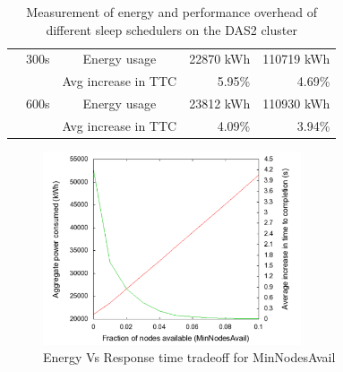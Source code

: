 \begin{table}
\begin{tabular}{|c|c|c|r|r|}
        & 300s & Energy usage & 22870 kWh & 110719 kWh \\\cline{3-5}
        & & Avg increase in TTC & 5.95\% & 4.69\% \\\cline{2-5}
        
        & 600s & Energy usage & 23812 kWh & 110930 kWh \\\cline{3-5}
        & & Avg increase in TTC & 4.09\% & 3.94\% \\\cline{2-5}
        \hline
    \end{tabular}
    \caption{Measurement of energy and performance overhead of different sleep schedulers on the DAS2 cluster}
    \label{tab:sleep-overhead}
\end{table}

\begin{figure}[ht]
\centering
\begin{center}
\includegraphics[width=3.0in]{graphs/ttcvsenergy.pdf}
\vspace{-0.1in}
\caption{{\normalsize Energy Vs Response time tradeoff for MinNodesAvail}\label{fig:ttc-energy}}
\vspace{-0.1in}
\end{center}
\end{figure}


